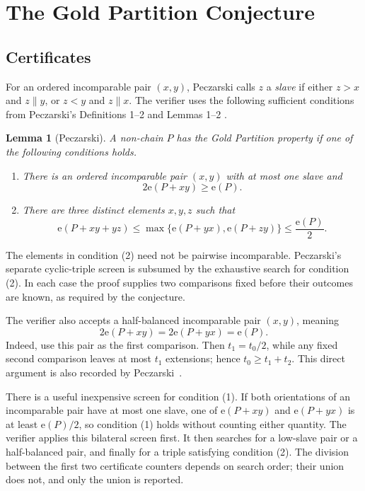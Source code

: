 \documentclass[11pt]{article}
\newtheorem{lemma}[theorem]{Lemma}
\theoremstyle{definition}
\newcommand{\ext}{\mathrm{e}}
\begin{document}
\section{The Gold Partition Conjecture}\label{sec:certificates}

\subsection{Certificates}

For an ordered incomparable pair $(x,y)$, Peczarski calls $z$ a \emph{slave}
if either $z>x$ and $z\parallel y$, or $z<y$ and $z\parallel x$.  The verifier
uses the following sufficient conditions from Peczarski's Definitions 1--2 and
Lemmas 1--2 \cite[pp.~91--92]{peczarski-gold}.

\begin{lemma}[Peczarski]\label{lem:certificates}
A non-chain $P$ has the Gold Partition property if one of the following
conditions holds.
\begin{enumerate}
  \item There is an ordered incomparable pair $(x,y)$ with at most one slave
  and
  \[
    2\ext(P+xy)\geq\ext(P).
  \]
  \item There are three distinct elements $x,y,z$ such that
  \[
    \ext(P+xy+yz)
      \leq \max\{\ext(P+yx),\ext(P+zy)\}
      \leq \frac{\ext(P)}2.
  \]
\end{enumerate}
\end{lemma}

The elements in condition (2) need not be pairwise incomparable.  Peczarski's
separate cyclic-triple screen is subsumed by the exhaustive search for
condition (2).  In each case the proof supplies two comparisons fixed before
their outcomes are known, as required by the conjecture.

The verifier also accepts a half-balanced incomparable pair $(x,y)$, meaning
\[
  2\ext(P+xy)=2\ext(P+yx)=\ext(P).
\]
Indeed, use this pair as the first comparison.  Then $t_1=t_0/2$, while any
fixed second comparison leaves at most $t_1$ extensions; hence
$t_0\geq t_1+t_2$.  This direct argument is also recorded by
Peczarski~\cite{peczarski-comments}.

There is a useful inexpensive screen for condition (1).  If both orientations
of an incomparable pair have at most one slave, one of $\ext(P+xy)$ and
$\ext(P+yx)$ is at least $\ext(P)/2$, so condition (1) holds without counting
either quantity.  The verifier applies this bilateral screen first.  It then
searches for a low-slave pair or a half-balanced pair, and finally for a
triple satisfying condition (2).  The division between the first two
certificate counters depends on search order; their union does not, and only
the union is reported.
\end{document}
